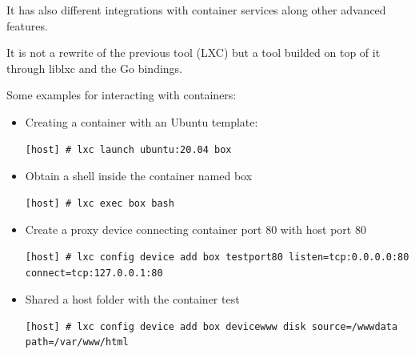 It has also different integrations with container services along other advanced features.

It is not a rewrite of the previous tool (LXC) but a tool builded on top of it through liblxc and the Go bindings.

Some examples for interacting with containers:

\begin{itemize}
	\item{Creating a container with an Ubuntu template}:
	      \begin{verbatim}
[host] # lxc launch ubuntu:20.04 box
	\end{verbatim}
	\item{Obtain a shell inside the container named box}
	      \begin{verbatim}
[host] # lxc exec box bash 
	\end{verbatim}
	\item{Create a proxy device connecting container port 80 with host port 80}
	      \begin{verbatim}
[host] # lxc config device add box testport80 listen=tcp:0.0.0.0:80 connect=tcp:127.0.0.1:80 
	\end{verbatim}
	\item{Shared a host folder with the container test}
	      \begin{verbatim}
[host] # lxc config device add box devicewww disk source=/wwwdata path=/var/www/html 
	\end{verbatim}
\end{itemize}




